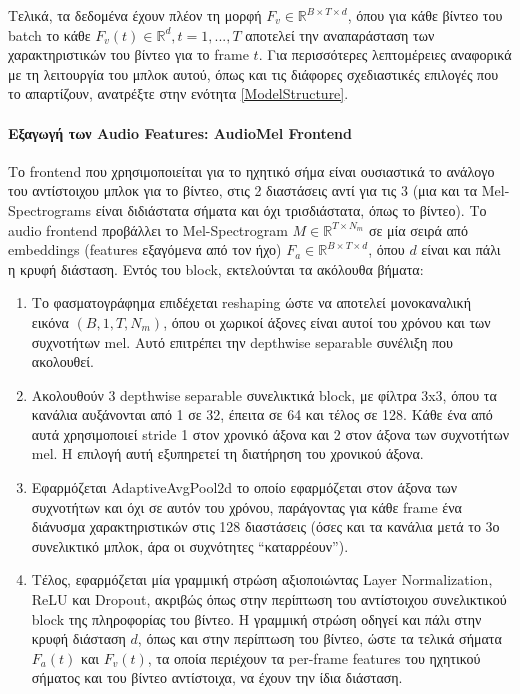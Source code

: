 Τελικά, τα δεδομένα έχουν πλέον τη μορφή $F_v \in \mathbb{R}^{B \times T \times d}$, όπου για κάθε βίντεο του batch το κάθε $F_v(t) \in \mathbb{R}^d, t=1,...,T$ αποτελεί την αναπαράσταση των χαρακτηριστικών του βίντεο για το frame $t$. Για περισσότερες λεπτομέρειες αναφορικά με τη λειτουργία του μπλοκ αυτού, όπως και τις διάφορες σχεδιαστικές επιλογές που το απαρτίζουν, ανατρέξτε στην ενότητα \ref{ModelStructure}.

\paragraph{Εξαγωγή των Audio Features: AudioMel Frontend}

Το frontend που χρησιμοποιείται για το ηχητικό σήμα είναι ουσιαστικά το ανάλογο του αντίστοιχου μπλοκ για το βίντεο, στις 2 διαστάσεις αντί για τις 3 (μια και τα Mel-Spectrograms είναι διδιάστατα σήματα και όχι τρισδιάστατα, όπως το βίντεο). Το audio frontend προβάλλει το Mel-Spectrogram $M \in \mathbb{R}^{T \times N_m}$ σε μία σειρά από embeddings (features εξαγόμενα από τον ήχο) $F_a \in \mathbb{R}^{B \times T \times d}$, όπου $d$ είναι και πάλι η κρυφή διάσταση. Εντός του block, εκτελούνται τα ακόλουθα βήματα:

\begin{enumerate}
\item Το φασματογράφημα επιδέχεται reshaping ώστε να αποτελεί μονοκαναλική εικόνα $(B,1,T,N_m)$, όπου οι χωρικοί άξονες είναι αυτοί του χρόνου και των συχνοτήτων mel. Αυτό επιτρέπει την depthwise separable συνέλιξη που ακολουθεί.

\item Ακολουθούν 3 depthwise separable συνελικτικά block, με φίλτρα 3x3, όπου τα κανάλια αυξάνονται από 1 σε 32, έπειτα σε 64 και τέλος σε 128. Κάθε ένα από αυτά χρησιμοποιεί stride 1 στον χρονικό άξονα και 2 στον άξονα των συχνοτήτων mel. Η επιλογή αυτή εξυπηρετεί τη διατήρηση του χρονικού άξονα.

\item Εφαρμόζεται AdaptiveAvgPool2d το οποίο εφαρμόζεται στον άξονα των συχνοτήτων και όχι σε αυτόν του χρόνου, παράγοντας για κάθε frame ένα διάνυσμα χαρακτηριστικών στις 128 διαστάσεις (όσες και τα κανάλια μετά το 3ο συνελικτικό μπλοκ, άρα οι συχνότητες ``καταρρέουν'').

\item Τέλος, εφαρμόζεται μία γραμμική στρώση αξιοποιώντας Layer Normalization, ReLU και Dropout, ακριβώς όπως στην περίπτωση του αντίστοιχου συνελικτικού block της πληροφορίας του βίντεο. Η γραμμική στρώση οδηγεί και πάλι στην κρυφή διάσταση $d$, όπως και στην περίπτωση του βίντεο, ώστε τα τελικά σήματα $F_a(t)$ και $F_v(t)$, τα οποία περιέχουν τα per-frame features του ηχητικού σήματος και του βίντεο αντίστοιχα, να έχουν την ίδια διάσταση.
\end{enumerate}

